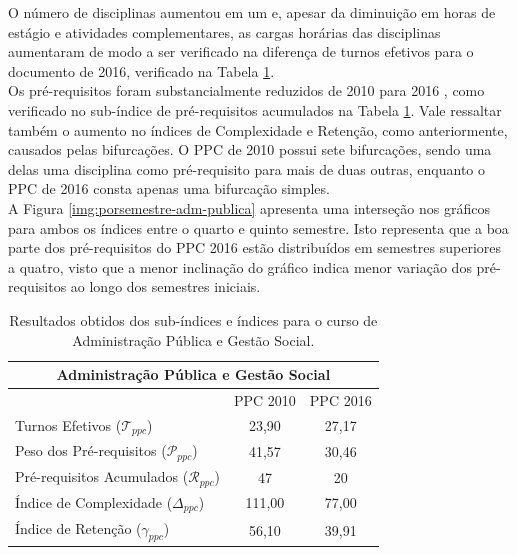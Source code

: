 \documentclass[a4paper, 12pt]{article}
\begin{document}
O número de disciplinas aumentou em um e, apesar da diminuição em horas de estágio e atividades complementares, as cargas horárias das disciplinas aumentaram 
de modo a ser verificado na diferença de turnos efetivos para o documento de 2016, verificado na Tabela \ref{tab:adm-publica}. \\

Os pré-requisitos foram substancialmente reduzidos de 2010 \cite{adm-publica2010} para 2016 \cite{adm-publica2016}, como verificado no sub-índice de pré-requisitos acumulados na Tabela \ref{tab:adm-publica}. 
Vale ressaltar também o aumento no índices de Complexidade e Retenção, como anteriormente, causados pelas bifurcações. O PPC de 2010 possui sete bifurcações, 
sendo uma delas uma disciplina como pré-requisito para mais de duas outras, 
enquanto o PPC de 2016 consta apenas uma bifurcação simples. \\

A Figura \ref{img:porsemestre-adm-publica} apresenta uma interseção nos gráficos para ambos os índices entre o quarto e quinto semestre. Isto representa que 
a boa parte dos pré-requisitos do PPC 2016 estão distribuídos em semestres superiores a quatro, visto que a menor inclinação do gráfico indica menor variação 
dos pré-requisitos ao longo dos semestres iniciais. \\


\begin{center}
\begin{table}[h]
\centering
\begin{tabular}{|l|c|c|}
\hline
\multicolumn{3}{|c|}{Administração Pública e Gestão Social} \\ 
\hline\hline
	& PPC 2010 & PPC 2016 \\
\hline
Turnos Efetivos ($\mathcal{T}_{ppc}$) & 23,90 & 27,17 \\
\hline
Peso dos Pré-requisitos ($\mathcal{P}_{ppc}$) & 41,57 & 30,46 \\
\hline
Pré-requisitos Acumulados ($\mathcal{R}_{ppc}$) & 47 & 20 \\
\hline
Índice de Complexidade ($\Delta_{ppc}$) & 111,00 & 77,00 \\
\hline
Índice de Retenção ($\gamma_{ppc}$) & 56,10 & 39,91 \\ 
\hline
\end{tabular}
\caption{Resultados obtidos dos sub-índices e índices para o curso de Administração Pública e Gestão Social.}
\label{tab:adm-publica}
\end{table}
\end{center}
\end{document}

